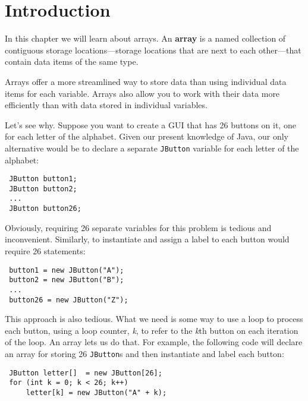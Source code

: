 \section{Introduction}

\noindent In this chapter we will learn about arrays.  An {\bf array} 
is a named collection of contiguous storage locations---storage
locations that are next to each other---that contain data items of the
same type.

Arrays offer a more streamlined way to store data than using
individual data items for each variable.  Arrays also allow you to
work with their data more efficiently than with data stored in
individual variables.

Let's see why.  Suppose you want to create a GUI that has 26 buttons
on it, one for each letter of the alphabet.  Given our present
knowledge of Java, our only alternative would be to declare a separate
{\tt JButton} variable for each letter of the alphabet:

\begin{jjjlisting}
\begin{lstlisting}
 JButton button1;
 JButton button2;
 ...
 JButton button26;
\end{lstlisting}
\end{jjjlisting}

\noindent Obviously, requiring 26 separate variables for this
problem is tedious and inconvenient. Similarly, to instantiate and
assign a label to each button would require 26 statements:

\begin{jjjlisting}
\begin{lstlisting}
 button1 = new JButton("A");
 button2 = new JButton("B");
 ...
 button26 = new JButton("Z");
\end{lstlisting}
\end{jjjlisting}

\noindent This approach is also tedious.  What we need is some way to
use a loop to process each button, using a loop counter, {\it k}, to
refer to the {\it k}th button on each iteration of the loop.  An array
lets us do that.  For example, the following code will declare an
array for storing 26 {\tt JButton}s and then instantiate and label
each button:

\begin{jjjlisting}\begin{lstlisting}
 JButton letter[]  = new JButton[26];
 for (int k = 0; k < 26; k++)
     letter[k] = new JButton("A" + k);
\end{lstlisting}
\end{jjjlisting}

